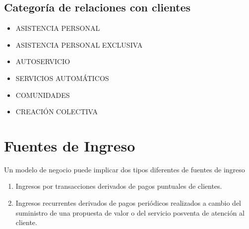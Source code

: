 \documentclass[11pt]{book}
\begin{document}
\section{Categoría de relaciones con clientes}
\begin{itemize}
\item ASISTENCIA PERSONAL \\

\item ASISTENCIA PERSONAL EXCLUSIVA\\

\item AUTOSERVICIO\\

\item SERVICIOS AUTOMÁTICOS\\

\item COMUNIDADES\\

\item CREACIÓN COLECTIVA\\ 

\end{itemize}
\chapter{Fuentes de Ingreso}
Un modelo de negocio puede implicar dos tipos diferentes de fuentes de ingreso 
\begin{enumerate}
\item Ingresos por transacciones derivados de pagos puntuales de clientes.
\item   Ingresos recurrentes derivados de pagos periódicos realizados a 
cambio del suministro de una propuesta de valor o del servicio 
posventa de atención al cliente.
\end{enumerate}	
\end{document}
